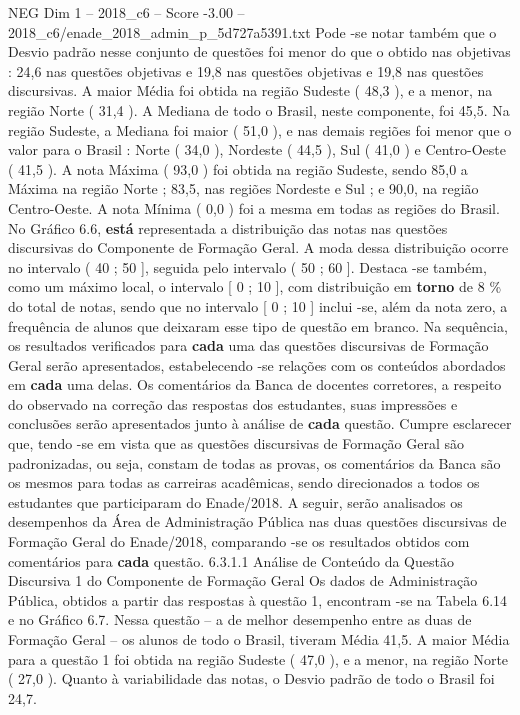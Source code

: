 \begin{textsample}{NEG Dim 1 – 2018\_c6 – Score -3.00 – 2018\_c6/enade\_2018\_admin\_p\_5d727a5391.txt}
Pode -se notar também que o Desvio padrão nesse conjunto de questões foi menor do que o obtido nas objetivas : 24,6 nas questões objetivas e 19,8 nas questões objetivas e 19,8 nas questões discursivas.
A maior Média foi obtida na região Sudeste ( 48,3 ), e a menor, na região Norte ( 31,4 ).
A Mediana de todo o Brasil, neste componente, foi 45,5.
Na região Sudeste, a Mediana foi maior ( 51,0 ), e nas demais regiões foi menor que o valor para o Brasil : Norte ( 34,0 ), Nordeste ( 44,5 ), Sul ( 41,0 ) e Centro-Oeste ( 41,5 ).
A nota Máxima ( 93,0 ) foi obtida na região Sudeste, sendo 85,0 a Máxima na região Norte ; 83,5, nas regiões Nordeste e Sul ; e 90,0, na região Centro-Oeste.
A nota Mínima ( 0,0 ) foi a mesma em todas as regiões do Brasil.
No Gráfico 6.6, \textbf{está} representada a distribuição das notas nas questões discursivas do Componente de Formação Geral.
A moda dessa distribuição ocorre no intervalo ( 40 ; 50 ], seguida pelo intervalo ( 50 ; 60 ].
Destaca -se também, como um máximo local, o intervalo [ 0 ; 10 ], com distribuição em \textbf{torno} de 8 \% do total de notas, sendo que no intervalo [ 0 ; 10 ] inclui -se, além da nota zero, a frequência de alunos que deixaram esse tipo de questão em branco.
Na sequência, os resultados verificados para \textbf{cada} uma das questões discursivas de Formação Geral serão apresentados, estabelecendo -se relações com os conteúdos abordados em \textbf{cada} uma delas.
Os comentários da Banca de docentes corretores, a respeito do observado na correção das respostas dos estudantes, suas impressões e conclusões serão apresentados junto à análise de \textbf{cada} questão.
Cumpre esclarecer que, tendo -se em vista que as questões discursivas de Formação Geral são padronizadas, ou seja, constam de todas as provas, os comentários da Banca são os mesmos para todas as carreiras acadêmicas, sendo direcionados a todos os estudantes que participaram do Enade/2018.
A seguir, serão analisados os desempenhos da Área de Administração Pública nas duas questões discursivas de Formação Geral do Enade/2018, comparando -se os resultados obtidos com comentários para \textbf{cada} questão. 6.3.1.1 Análise de Conteúdo da Questão Discursiva 1 do Componente de Formação Geral Os dados de Administração Pública, obtidos a partir das respostas à questão 1, encontram -se na Tabela 6.14 e no Gráfico 6.7.
Nessa questão – a de melhor desempenho entre as duas de Formação Geral – os alunos de todo o Brasil, tiveram Média 41,5.
A maior Média para a questão 1 foi obtida na região Sudeste ( 47,0 ), e a menor, na região Norte ( 27,0 ).
Quanto à variabilidade das notas, o Desvio padrão de todo o Brasil foi 24,7.

\end{textsample}
